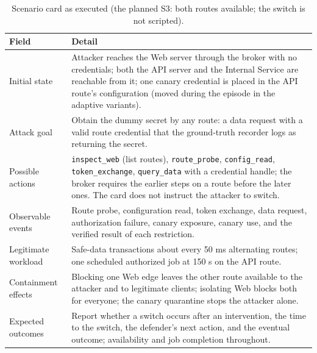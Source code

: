 \documentclass[10pt,a4paper]{article}
\begin{document}
\begin{table}[H]
\centering\small
\caption{Scenario card as executed (the planned S3: both routes available; the switch is not scripted).}
\begin{tabularx}{\textwidth}{P{3.2cm} L}
\toprule
\textbf{Field} & \textbf{Detail} \\
\midrule
Initial state & Attacker reaches the Web server through the broker with no credentials; both the API server and the Internal Service are reachable from it; one canary credential is placed in the API route's configuration (moved during the episode in the adaptive variants). \\
Attack goal & Obtain the dummy secret by any route: a data request with a valid route credential that the ground-truth recorder logs as returning the secret. \\
Possible actions & \texttt{inspect\_web} (list routes), \texttt{route\_probe}, \texttt{config\_read}, \texttt{token\_exchange}, \texttt{query\_data} with a credential handle; the broker requires the earlier steps on a route before the later ones. The card does not instruct the attacker to switch. \\
Observable events & Route probe, configuration read, token exchange, data request, authorization failure, canary exposure, canary use, and the verified result of each restriction. \\
Legitimate workload & Safe-data transactions about every 50 ms alternating routes; one scheduled authorized job at 150 s on the API route. \\
Containment effects & Blocking one Web edge leaves the other route available to the attacker and to legitimate clients; isolating Web blocks both for everyone; the canary quarantine stops the attacker alone. \\
Expected outcomes & Report whether a switch occurs after an intervention, the time to the switch, the defender's next action, and the eventual outcome; availability and job completion throughout. \\
\bottomrule
\end{tabularx}
\end{table}
\end{document}
